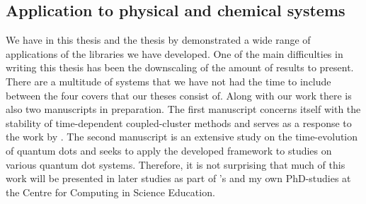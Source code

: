         \subsection{Application to physical and chemical systems}
            We have in this thesis and the thesis by \citeauthor{greg-winther}
            \cite{greg-winther} demonstrated a wide range of applications of the
            libraries we have developed.
            One of the main difficulties in writing this thesis has been the
            downscaling of the amount of results to present.
            There are a multitude of systems that we have not had the time to
            include between the four covers that our theses consist of.
            Along with our work there is also two manuscripts in preparation.
            The first manuscript concerns itself with the stability of
            time-dependent coupled-cluster methods \cite{oa-stability} and
            serves as a response to the work by
            \citeauthor{pedersen2018symplectic} \cite{pedersen2018symplectic}.
            The second manuscript is an extensive study on the time-evolution of
            quantum dots \cite{td-quantum-dots} and seeks to apply the developed
            framework to studies on various quantum dot systems.
            Therefore, it is not surprising that much of this work will be
            presented in later studies as part of \citeauthor{greg-winther}'s
            and my own PhD-studies at the Centre for Computing in Science
            Education.

